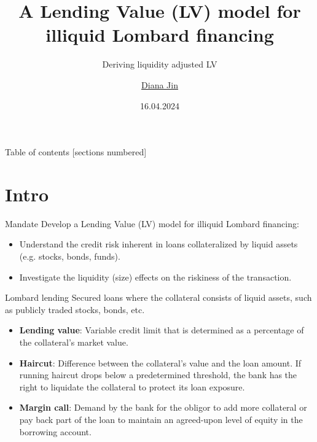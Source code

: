 \documentclass[compress, 10pt, notes]{beamer}  %
\title{A Lending Value (LV) model for illiquid Lombard financing}
\subtitle{Deriving liquidity adjusted LV}
\date{16.04.2024}
\author{\href{mailto:diana.jin@uzh.ch}{Diana Jin}}
\institute{Applied Credit Risk Modeling}
\begin{document}
\maketitle
\begin{frame}{Table of contents}
[sections numbered]
  \tableofcontents%
\end{frame}
\section[Intro]{Intro}

\begin{frame}[fragile]{Mandate}
    Develop a Lending Value (LV) model for illiquid Lombard financing:
    \begin{itemize}
        \item Understand the credit risk inherent in loans collateralized by liquid assets (e.g. stocks, bonds, funds).
        \item Investigate the liquidity (size) effects on the riskiness of the transaction.
    \end{itemize}
\end{frame}

\begin{frame}[fragile]{Lombard lending}
    Secured loans where the collateral consists of liquid assets, such as publicly traded stocks, bonds, etc.
    \begin{itemize}
        \item \textbf{Lending value}: Variable credit limit that is determined as a percentage of the collateral's market value.
        \item \textbf{Haircut}: Difference between the collateral's value and the loan amount. If running haircut drops below a predetermined threshold, the bank has the right to liquidate the collateral to protect its loan exposure.
        \item \textbf{Margin call}: Demand by the bank for the obligor to add more collateral or pay back part of the loan to maintain an agreed-upon level of equity in the borrowing account.
    \end{itemize}
\end{frame}
\end{document}
